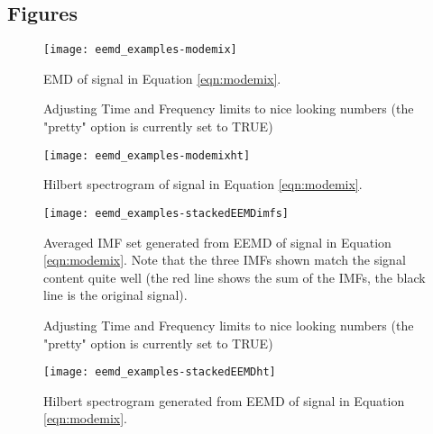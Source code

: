 \documentclass[12pt]{article}
\begin{document}
\subsection{Figures}

\FloatBarrier

\begin{figure}[ht]
\begin{center}
\texttt{[image: eemd\_examples-modemix]}
\end{center}
\caption{EMD of signal in Equation \ref{eqn:modemix}.}
\label{fig:modemix}
\end{figure}

\begin{figure}[ht]
\begin{center}
\begin{Schunk}
\begin{Soutput}
Adjusting Time and Frequency limits to nice looking numbers (the "pretty" option is currently set to TRUE)
\end{Soutput}
\end{Schunk}
\texttt{[image: eemd\_examples-modemixht]}
\end{center}
\caption{Hilbert spectrogram of signal in Equation \ref{eqn:modemix}.}
\label{fig:modemixht}
\end{figure}

\begin{figure}[ht]
\begin{center}
\texttt{[image: eemd\_examples-stackedEEMDimfs]}
\end{center}
\caption{Averaged IMF set generated from EEMD of signal in Equation \ref{eqn:modemix}.
Note that the three IMFs shown match the signal content quite well (the red line shows the sum of the IMFs, the black line is the original signal).}
\label{fig:stackedEEMDimfs}
\end{figure}

\begin{figure}[ht]
\begin{center}
\begin{Schunk}
\begin{Soutput}
Adjusting Time and Frequency limits to nice looking numbers (the "pretty" option is currently set to TRUE)
\end{Soutput}
\end{Schunk}
\texttt{[image: eemd\_examples-stackedEEMDht]}
\end{center}
\caption{Hilbert spectrogram generated from EEMD of signal in Equation \ref{eqn:modemix}.}
\label{fig:stackedEEMDht}
\end{figure}
\end{document}
